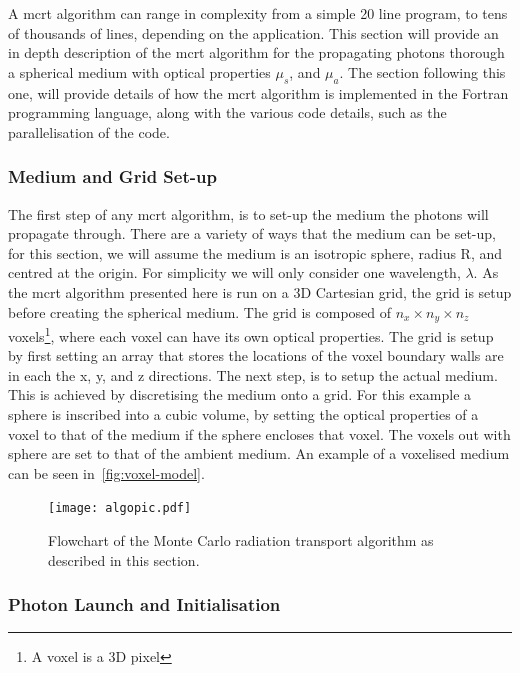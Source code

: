 A \gls*{mcrt} algorithm can range in complexity from a simple 20 line program, to tens of thousands of lines, depending on the application. This section will provide an in depth description of the \gls*{mcrt} algorithm for the propagating photons thorough a spherical medium with optical properties $\mu_s$, and $\mu_a$. The section following this one, will provide details of how the \gls*{mcrt} algorithm is implemented in the Fortran programming language, along with the various code details, such as the parallelisation of the code.


\subsubsection*{Medium and Grid Set-up}\label{sec:algomedium}
The first step of any \gls*{mcrt} algorithm, is to set-up the medium the photons will propagate through. There are a variety of ways that the medium can be set-up, for this section, we will assume the medium is an isotropic sphere, radius R, and centred at the origin. For simplicity we will only consider one wavelength, $\lambda$. As the \gls*{mcrt} algorithm presented here is run on a 3D Cartesian grid, the grid is setup before creating the spherical medium. The grid is composed of $n_x \times n_y \times n_z$ voxels\footnote{A voxel is a 3D pixel}, where each voxel can have its own optical properties. The grid is setup by first setting an array that stores the locations of the voxel boundary walls are in each the x, y, and z directions. The next step, is to setup the actual medium. This is achieved by discretising the medium onto a grid. For this example a sphere is inscribed into a cubic volume, by setting the optical properties of a voxel to that of the medium if the sphere encloses that voxel. The voxels out with sphere are set to that of the ambient medium. An example of a voxelised medium can be seen in~\cref{fig:voxel-model}. 

\begin{figure}
\centering
\texttt{[image: algopic.pdf]}
\caption{Flowchart of the Monte Carlo radiation transport algorithm as described in this section.}
\label{fig:algo}
\vspace{-150pt}
\end{figure}
\leavevmode
\FloatBarrier

\subsubsection*{Photon Launch and Initialisation}\label{sec:photlaunch}

